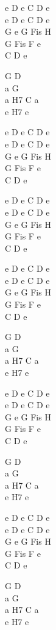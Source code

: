 \begin{chord}
    e D e C D e\\
    e D e C D e\\
    G e G Fis H\\
    G Fis F e\\
	C D e

    G D\\
    a G\\
    a H7 C a\\
	e H7 e
	
	e D e C D e\\
    e D e C D e\\
    G e G Fis H\\
    G Fis F e\\
	C D e
	
	e D e C D e\\
    e D e C D e\\
    G e G Fis H\\
    G Fis F e\\
	C D e
	
	e D e C D e\\
    e D e C D e\\
    G e G Fis H\\
    G Fis F e\\
	C D e
	
	G D\\
    a G\\
    a H7 C a\\
	e H7 e
	
	e D e C D e\\
    e D e C D e\\
    G e G Fis H\\
    G Fis F e\\
	C D e
	
	G D\\
    a G\\
    a H7 C a\\
	e H7 e
	
	e D e C D e\\
    e D e C D e\\
    G e G Fis H\\
    G Fis F e\\
	C D e
	
	G D\\
    a G\\
    a H7 C a\\
	e H7 e
\end{chord}